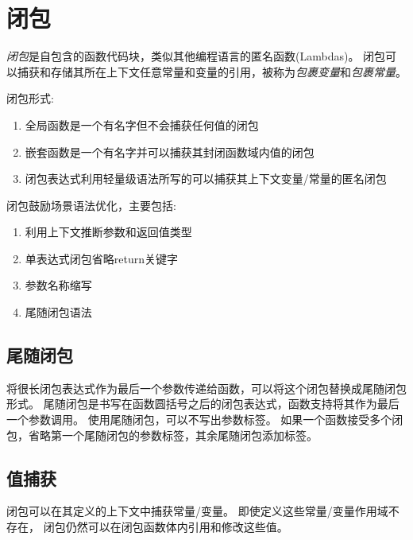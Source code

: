 \documentclass{../main.tex}{subfiles}
\begin{document}
\section{闭包}
\emph{闭包}是自包含的函数代码块，类似其他编程语言的匿名函数(Lambdas)。
闭包可以捕获和存储其所在上下文任意常量和变量的引用，被称为\emph{包裹变量}和\emph{包裹常量}。

闭包形式:
\begin{enumerate}[itemsep=0pt, parsep=0pt, topsep=0pt, partopsep=0pt]
  \item 全局函数是一个有名字但不会捕获任何值的闭包
  \item 嵌套函数是一个有名字并可以捕获其封闭函数域内值的闭包
  \item 闭包表达式利用轻量级语法所写的可以捕获其上下文变量/常量的匿名闭包
\end{enumerate}
闭包鼓励场景语法优化，主要包括:
\begin{enumerate}[itemsep=0pt, parsep=0pt, topsep=0pt, partopsep=0pt]
  \item 利用上下文推断参数和返回值类型
  \item 单表达式闭包省略return关键字
  \item 参数名称缩写
  \item 尾随闭包语法
\end{enumerate}

\subsection{尾随闭包}
将很长闭包表达式作为最后一个参数传递给函数，可以将这个闭包替换成尾随闭包形式。
尾随闭包是书写在函数圆括号之后的闭包表达式，函数支持将其作为最后一个参数调用。
使用尾随闭包，可以不写出参数标签。
如果一个函数接受多个闭包，省略第一个尾随闭包的参数标签，其余尾随闭包添加标签。




\subsection{值捕获}
闭包可以在其定义的上下文中捕获常量/变量。
即使定义这些常量/变量作用域不存在，
闭包仍然可以在闭包函数体内引用和修改这些值。
\end{document}
